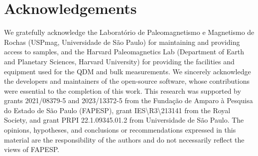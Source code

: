 \section{Acknowledgements}

We gratefully acknowledge the Laboratório de Paleomagnetismo e Magnetismo de Rochas (USPmag, Universidade de São Paulo) for maintaining and providing access to samples, and the Harvard Paleomagnetics Lab (Department of Earth and Planetary Sciences, Harvard University) for providing the facilities and equipment used for the QDM and bulk measurements. We sincerely acknowledge the developers and maintainers of the open-source software, whose contributions were essential to the completion of this work. This research was supported by grants 2021/08379-5 and 2023/13372-5 from the Fundação de Amparo à Pesquisa do Estado de São Paulo (FAPESP), grant IES\textbackslash{}R3\textbackslash{}213141 from the Royal Society, and grant PRPI 22.1.09345.01.2 from Universidade de São Paulo.
The opinions, hypotheses, and conclusions or recommendations expressed in this material are the responsibility of the authors and do not necessarily reflect the views of FAPESP.


